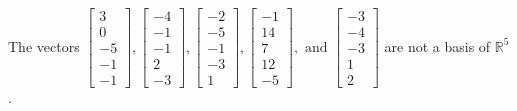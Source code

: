 \begin{exercise}
\begin{exerciseStatement}
  \end{exerciseStatement}
  \begin{exerciseAnswer}
   The vectors \(\left[\begin{array}{r}
3 \\
0 \\
-5 \\
-1 \\
-1
\end{array}\right] , \left[\begin{array}{r}
-4 \\
-1 \\
-1 \\
2 \\
-3
\end{array}\right] , \left[\begin{array}{r}
-2 \\
-5 \\
-1 \\
-3 \\
1
\end{array}\right] , \left[\begin{array}{r}
-1 \\
14 \\
7 \\
12 \\
-5
\end{array}\right] , \text{ and } \left[\begin{array}{r}
-3 \\
-4 \\
-3 \\
1 \\
2
\end{array}\right]\) 
  	 are not  a basis of \(\mathbb{R}^5\).
  


  \end{exerciseAnswer}
\end{exercise}